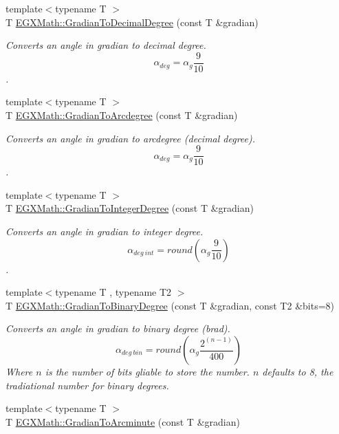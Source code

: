 \begin{DoxyCompactItemize}
{\footnotesize template$<$typename T $>$ }\\T \mbox{\hyperlink{group___e_g_x_math-_angle_conversions-_gradian_ga346f47c519d5261b689cec49f4a8e789}{E\+G\+X\+Math\+::\+Gradian\+To\+Decimal\+Degree}} (const T \&gradian)
\begin{DoxyCompactList}\small\item\em Converts an angle in gradian to decimal degree. \[\alpha_{deg}=\alpha_{g}\frac{9}{10}\]. \end{DoxyCompactList}\item 
{\footnotesize template$<$typename T $>$ }\\T \mbox{\hyperlink{group___e_g_x_math-_angle_conversions-_gradian_gacd0b1797f2460944dcbc541a855ec21c}{E\+G\+X\+Math\+::\+Gradian\+To\+Arcdegree}} (const T \&gradian)
\begin{DoxyCompactList}\small\item\em Converts an angle in gradian to arcdegree (decimal degree). \[\alpha_{deg}=\alpha_{g}\frac{9}{10}\]. \end{DoxyCompactList}\item 
{\footnotesize template$<$typename T $>$ }\\T \mbox{\hyperlink{group___e_g_x_math-_angle_conversions-_gradian_ga555aae885f8a7d0876a36aa07cbbd816}{E\+G\+X\+Math\+::\+Gradian\+To\+Integer\+Degree}} (const T \&gradian)
\begin{DoxyCompactList}\small\item\em Converts an angle in gradian to integer degree. \[\alpha_{deg\ int}=round(\alpha_{g}\frac{9}{10})\]. \end{DoxyCompactList}\item 
{\footnotesize template$<$typename T , typename T2 $>$ }\\T \mbox{\hyperlink{group___e_g_x_math-_angle_conversions-_gradian_ga6bf31920148bfd61f1f06eb961c3f62b}{E\+G\+X\+Math\+::\+Gradian\+To\+Binary\+Degree}} (const T \&gradian, const T2 \&bits=8)
\begin{DoxyCompactList}\small\item\em Converts an angle in gradian to binary degree (brad). \[\alpha_{deg\ bin}=round(\alpha_{g}\frac{2^{(n-1)}}{400})\] Where $n$ is the number of bits gliable to store the number. $n$ defaults to 8, the tradiational number for binary degrees. \end{DoxyCompactList}\item 
{\footnotesize template$<$typename T $>$ }\\T \mbox{\hyperlink{group___e_g_x_math-_angle_conversions-_gradian_ga67ef7daad49b0d73c39c52d426ab46a5}{E\+G\+X\+Math\+::\+Gradian\+To\+Arcminute}} (const T \&gradian)

\end{DoxyCompactItemize}
